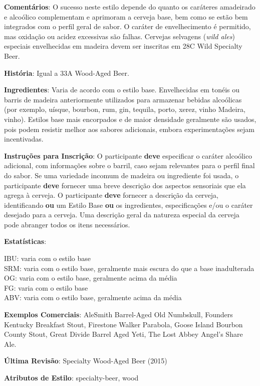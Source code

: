 \textbf{Comentários}: O sucesso neste estilo depende do quanto os caráteres amadeirado e alcoólico complementam e aprimoram a cerveja base, bem como se estão bem integrados com o perfil geral de sabor. O caráter de envelhecimento é permitido, mas oxidação ou acidez excessivas são falhas. Cervejas selvagens (\textit{wild ales}) especiais envelhecidas em madeira devem ser inscritas em 28C Wild Specialty Beer.

\textbf{História}: Igual a 33A Wood-Aged Beer.

\textbf{Ingredientes}: Varia de acordo com o estilo base. Envelhecidas em tonéis ou barris de madeira anteriormente utilizados para armazenar bebidas alcoólicas (por exemplo, uísque, bourbon, rum, gin, tequila, porto, xerez, vinho Madeira, vinho). Estilos base mais encorpados e de maior densidade geralmente são usados, pois podem resistir melhor aos sabores adicionais, embora experimentações sejam incentivadas.

\textbf{Instruções para Inscrição}: O participante \textbf{deve} especificar o caráter alcoólico adicional, com informações sobre o barril, caso sejam relevantes para o perfil final do sabor. Se uma variedade incomum de madeira ou ingrediente foi usada, o participante \textbf{deve} fornecer uma breve descrição dos aspectos sensoriais que ela agrega à cerveja. O participante \textbf{deve} fornecer a descrição da cerveja, identificando \textbf{ou} um Estilo Base \textbf{ou} os ingredientes, especificações e/ou o caráter desejado para a cerveja. Uma descrição geral da natureza especial da cerveja pode abranger todos os itens necessários.

\textbf{Estatísticas}:

IBU: varia com o estilo base\\
SRM: varia com o estilo base, geralmente mais escura do que a base inadulterada\\
OG: varia com o estilo base, geralmente acima da média\\
FG: varia com o estilo base\\
ABV: varia com o estilo base, geralmente acima da média

\textbf{Exemplos Comerciais}: AleSmith Barrel-Aged Old Numbskull, Founders Kentucky Breakfast Stout, Firestone Walker Parabola, Goose Island Bourbon County Stout, Great Divide Barrel Aged Yeti, The Lost Abbey Angel’s Share Ale.

\textbf{Última Revisão}: Specialty Wood-Aged Beer (2015)

\textbf{Atributos de Estilo}: specialty-beer, wood
